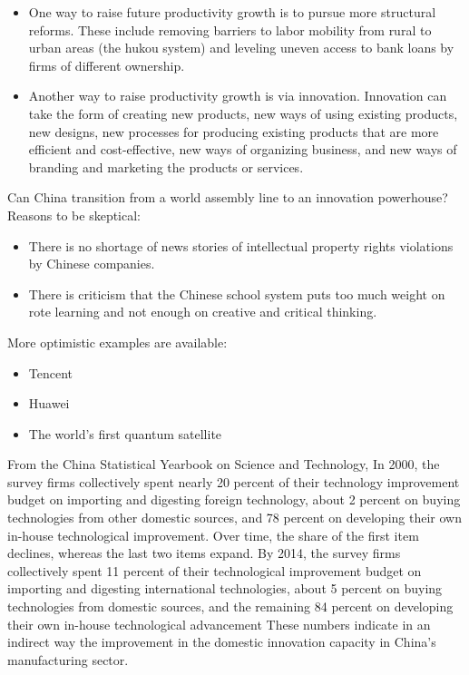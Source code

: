 \documentclass{article}
\begin{document}
    \begin{itemize}
        \item One way to raise future productivity growth is to pursue more structural reforms. These include removing barriers to labor mobility from rural to urban areas (the hukou system) and leveling uneven access to bank loans by firms of different ownership.
        \item Another way to raise productivity growth is via innovation. Innovation can take the form of creating new products, new ways of using existing products, new designs, new processes for producing existing products that are more efficient and cost-effective, new ways of organizing business, and new ways of branding and marketing the products or services.
    \end{itemize}

    Can China transition from a world assembly line to an innovation powerhouse? Reasons to be skeptical:
    \begin{itemize}
        \item There is no shortage of news stories of intellectual property rights violations by Chinese companies.
        \item There is criticism that the Chinese school system puts too much weight on rote learning and not enough on creative and critical thinking.
    \end{itemize}
    More optimistic examples are available:
    \begin{itemize}
        \item Tencent
        \item Huawei
        \item The world’s first quantum satellite
    \end{itemize}

    From the China Statistical Yearbook on Science and Technology, In 2000, the survey firms collectively spent nearly 20 percent of their technology improvement budget on importing and digesting foreign technology, about 2 percent on buying technologies from other domestic sources, and 78 percent on developing their own in-house technological improvement. Over time, the share of the first item declines, whereas the last two items expand. By 2014, the survey firms collectively spent 11 percent of their technological improvement budget on importing and digesting international technologies, about 5 percent on buying technologies from domestic sources, and the remaining 84 percent on developing their own in-house technological advancement These numbers indicate in an indirect way the improvement in the domestic innovation capacity in China’s manufacturing sector.
\end{document}
